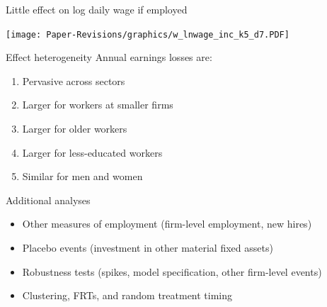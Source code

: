\documentclass[aspectratio=169]{beamer}
\begin{document}
\begin{frame}{Little effect on log daily wage if employed} \label{lnwage}
\noindent \begin{center}
	\texttt{[image: Paper-Revisions/graphics/w\_lnwage\_inc\_k5\_d7.PDF]}
	\end{center}
\end{frame}

\begin{frame}{Effect heterogeneity} \label{heterogeneity_slide}
Annual earnings losses are: \bigskip
\begin{enumerate}
\item Pervasive across sectors \hyperlink{est_het_1}{} \bigskip
\item Larger for workers at smaller firms \hyperlink{est_het_2}{} \bigskip
\item Larger for older workers \hyperlink{est_het_2}{} \bigskip
\item Larger for less-educated workers \hyperlink{est_het_2}{} \bigskip
\item Similar for men and women \hyperlink{est_het_1}{} 
\end{enumerate}
\end{frame}

\begin{frame}{Additional analyses} \label{additional}
\begin{itemize}
\item Other measures of employment (firm-level employment, new hires) \hyperlink{otheremp}{} \bigskip
\item Placebo events (investment in other material fixed assets) \hyperlink{placebo}{} \bigskip
\item Robustness tests (spikes, model specification, other firm-level events) \hyperlink{robustness}{} \bigskip
\item Clustering, FRTs, and random treatment timing \hyperlink{clustering}{}
\end{itemize}
\end{frame}
\end{document}
